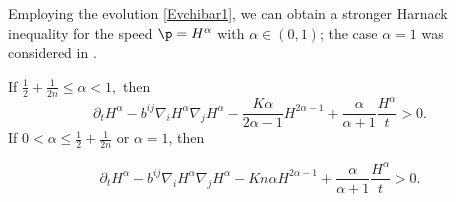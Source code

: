 \documentclass[12pt]{amsart}
\begin{document}
Employing the evolution \cref{Evchibar1}, we can obtain a stronger Harnack inequality for the speed \(\p = H^{\alpha}\) with \(\alpha \in (0,1)\); the case $\alpha=1$ was considered in \cite{2015arXiv150802821B}.
\begin{theorem}\label{thm: main 1}
If $\frac{1}{2}+\frac{1}{2n}\leq {\alpha}< 1,$ then
\[
\partial_t H^{\alpha} - b^{ij}\nabla_iH^{\alpha}\nabla_jH^{\alpha} - \frac{K {\alpha}}{2{\alpha}-1}H^{2{\alpha}-1} + \frac{{\alpha}}{{\alpha}+1} \frac{H^{\alpha}}{t} > 0.
\]
If $0<{\alpha}\leq \frac{1}{2} + \frac{1}{2n}$ or $\alpha=1$, then

\[
\partial_t H^{\alpha} - b^{ij}\nabla_iH^{\alpha}\nabla_jH^{\alpha} - K n{\alpha}H^{2{\alpha}-1} + \frac{{\alpha}}{{\alpha}+1} \frac{H^{\alpha}}{t} > 0.
\]
\end{theorem}
\end{document}
